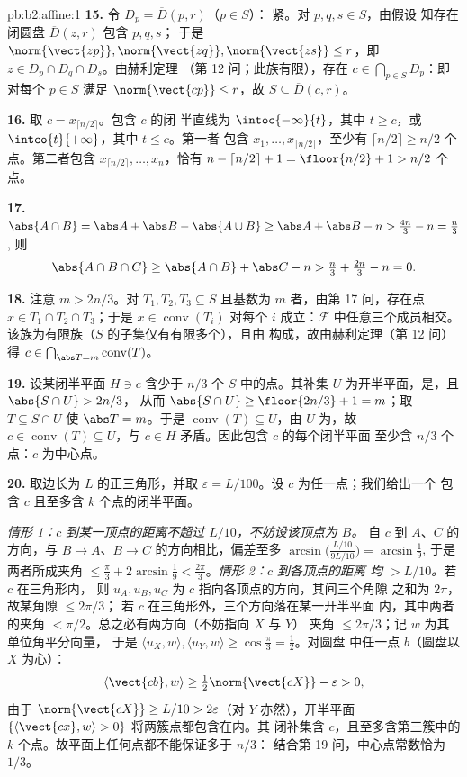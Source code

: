 \begin{solution}{pb:b2:affine:1}
\textbf{15.} 令 $D_p = \overline D(p, r)$（$p \in S$）：
紧。对 $p, q, s \in S$，由假设
知存在闭圆盘 $\overline D(z, r)$ 包含 $p, q, s$；
于是 $\norm{\vect{zp}}, \norm{\vect{zq}}, \norm{\vect{zs}}
\leq r$，即 $z \in D_p \cap D_q \cap D_s$。由赫利定理
（第 12 问；此族有限），存在 $c \in
\bigcap_{p \in S}D_p$：即对每个 $p \in S$ 满足
$\norm{\vect{cp}} \leq r$，故 $S \subseteq \overline D(c,
r)$。

\textbf{16.} 取 $c = x_{\lceil n/2\rceil}$。包含 $c$ 的闭
半直线为 $\intoc{-\infty}{t}$，其中 $t \geq
c$，或 $\intco{t}{+\infty}$，其中 $t \leq c$。第一者
包含 $x_1, \dots, x_{\lceil n/2\rceil}$，至少有
$\lceil n/2\rceil \geq n/2$ 个点。第二者包含
$x_{\lceil n/2\rceil}, \dots, x_n$，恰有 $n - \lceil
n/2\rceil + 1 = \floor{n/2} + 1 > n/2$ 个点。

\textbf{17.} $\abs{A \cap B} = \abs A + \abs B - \abs{A \cup
B} \geq \abs A + \abs B - n > \tfrac{4n}3 - n = \tfrac n3$,
则
\[
\abs{A \cap B \cap C} \geq \abs{A \cap B} + \abs C - n >
\tfrac n3 + \tfrac{2n}3 - n = 0 .
\]

\textbf{18.} 注意 $m > 2n/3$。对 $T_1, T_2, T_3 \subseteq S$
且基数为 $m$ 者，由第 17 问，存在点 $x \in T_1
\cap T_2 \cap T_3$；于是 $x \in \operatorname{conv}(T_i)$
对每个 $i$ 成立：$\mathcal F$ 中任意三个成员相交。
该族为有限族（$S$ 的子集仅有有限多个），且由
构成，故由赫利定理（第 12 问）得 $c \in
\bigcap_{\abs T = m}\operatorname{conv}(T)$。

\textbf{19.} 设某闭半平面 $H \ni c$
含少于 $n/3$ 个 $S$ 中的点。其补集 $U$
为开半平面，是，且 $\abs{S \cap U} > 2n/3$，
从而 $\abs{S \cap U} \geq \floor{2n/3} + 1 = m$；取 $T
\subseteq S \cap U$ 使 $\abs T = m$。于是
$\operatorname{conv}(T) \subseteq U$，由 $U$ 为，故
$c \in \operatorname{conv}(T) \subseteq U$，与
$c \in H$ 矛盾。因此包含 $c$ 的每个闭半平面
至少含 $n/3$ 个点：$c$ 为中心点。

\textbf{20.} 取边长为 $L$ 的正三角形，并取
$\varepsilon = L/100$。设 $c$ 为任一点；我们给出一个
包含 $c$ 且至多含 $k$ 个点的闭半平面。

\emph{情形 1：$c$ 到某一顶点的距离不超过 $L/10$，不妨设该顶点为 $B$。}
自 $c$ 到 $A$、$C$ 的方向，与
$B \to A$、$B \to C$ 的方向相比，偏差至多
$\arcsin\bigl(\tfrac{L/10}{9L/10}\bigr) = \arcsin\tfrac19$,
于是两者所成夹角 $\leq \tfrac\pi3 + 2\arcsin\tfrac19 <
\tfrac{2\pi}3$。\emph{情形 2：$c$ 到各顶点的距离
均 $> L/10$。}若 $c$ 在三角形内，
则 $u_A, u_B, u_C$ 为 $c$ 指向各顶点的方向，其间三个角隙
之和为 $2\pi$，故某角隙 $\leq 2\pi/3$；
若 $c$ 在三角形外，三个方向落在某一开半平面
内，其中两者的夹角 $<
\pi/2$。总之必有两方向（不妨指向 $X$ 与 $Y$）
夹角 $\leq 2\pi/3$；记 $w$ 为其单位角平分向量，
于是 $\langle u_X, w\rangle, \langle u_Y, w\rangle \geq
\cos\tfrac\pi3 = \tfrac12$。对圆盘
中任一点 $b$（圆盘以 $X$ 为心）：
\[
\langle \vect{cb}, w\rangle \geq
\tfrac12\norm{\vect{cX}} - \varepsilon > 0,
\]
由于 $\norm{\vect{cX}} \geq L/10 > 2\varepsilon$（对
$Y$ 亦然），开半平面 $\{\langle \vect{cx},
w\rangle > 0\}$ 将两簇点都包含在内。其
闭补集含 $c$，且至多含第三簇中的
$k$ 个点。故平面上任何点都不能保证多于 $n/3$：
结合第 19 问，中心点常数恰为 $1/3$。


\end{solution}
